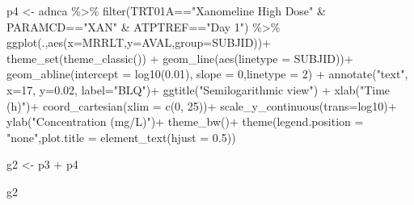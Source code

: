 \documentclass[
  letterpaper,
  DIV=11,
  numbers=noendperiod]{scrreprt}
\newenvironment{Shaded}{\begin{snugshade}}{\end{snugshade}}
\newcommand{\AttributeTok}[1]{\textcolor[rgb]{0.40,0.45,0.13}{#1}}
\newcommand{\DecValTok}[1]{\textcolor[rgb]{0.68,0.00,0.00}{#1}}
\newcommand{\FloatTok}[1]{\textcolor[rgb]{0.68,0.00,0.00}{#1}}
\newcommand{\FunctionTok}[1]{\textcolor[rgb]{0.28,0.35,0.67}{#1}}
\newcommand{\NormalTok}[1]{\textcolor[rgb]{0.00,0.23,0.31}{#1}}
\newcommand{\OtherTok}[1]{\textcolor[rgb]{0.00,0.23,0.31}{#1}}
\newcommand{\SpecialCharTok}[1]{\textcolor[rgb]{0.37,0.37,0.37}{#1}}
\newcommand{\StringTok}[1]{\textcolor[rgb]{0.13,0.47,0.30}{#1}}
\begin{document}
\begin{Shaded}
\begin{Highlighting}[]
\NormalTok{p4 }\OtherTok{\textless{}{-}}\NormalTok{ adnca }\SpecialCharTok{\%\textgreater{}\%} 
  \FunctionTok{filter}\NormalTok{(TRT01A}\SpecialCharTok{==}\StringTok{"Xanomeline High Dose"} \SpecialCharTok{\&} 
\NormalTok{        PARAMCD}\SpecialCharTok{==}\StringTok{"XAN"} \SpecialCharTok{\&}\NormalTok{ ATPTREF}\SpecialCharTok{==}\StringTok{"Day 1"}\NormalTok{) }\SpecialCharTok{\%\textgreater{}\%}
  \FunctionTok{ggplot}\NormalTok{(.,}\FunctionTok{aes}\NormalTok{(}\AttributeTok{x=}\NormalTok{MRRLT,}\AttributeTok{y=}\NormalTok{AVAL,}\AttributeTok{group=}\NormalTok{SUBJID))}\SpecialCharTok{+}
  \FunctionTok{theme\_set}\NormalTok{(}\FunctionTok{theme\_classic}\NormalTok{()) }\SpecialCharTok{+}
  \FunctionTok{geom\_line}\NormalTok{(}\FunctionTok{aes}\NormalTok{(}\AttributeTok{linetype =}\NormalTok{ SUBJID))}\SpecialCharTok{+}
  \FunctionTok{geom\_abline}\NormalTok{(}\AttributeTok{intercept =} \FunctionTok{log10}\NormalTok{(}\FloatTok{0.01}\NormalTok{), }\AttributeTok{slope =} \DecValTok{0}\NormalTok{,}\AttributeTok{linetype =} \DecValTok{2}\NormalTok{) }\SpecialCharTok{+}
  \FunctionTok{annotate}\NormalTok{(}\StringTok{"text"}\NormalTok{, }\AttributeTok{x=}\DecValTok{17}\NormalTok{, }\AttributeTok{y=}\FloatTok{0.02}\NormalTok{, }\AttributeTok{label=}\StringTok{"BLQ"}\NormalTok{)}\SpecialCharTok{+}
  \FunctionTok{ggtitle}\NormalTok{(}\StringTok{"Semilogarithmic view"}\NormalTok{) }\SpecialCharTok{+}
  \FunctionTok{xlab}\NormalTok{(}\StringTok{"Time (h)"}\NormalTok{)}\SpecialCharTok{+}
  \FunctionTok{coord\_cartesian}\NormalTok{(}\AttributeTok{xlim =} \FunctionTok{c}\NormalTok{(}\DecValTok{0}\NormalTok{, }\DecValTok{25}\NormalTok{))}\SpecialCharTok{+}
  \FunctionTok{scale\_y\_continuous}\NormalTok{(}\AttributeTok{trans=}\StringTok{\textquotesingle{}log10\textquotesingle{}}\NormalTok{)}\SpecialCharTok{+}
  \FunctionTok{ylab}\NormalTok{(}\StringTok{"Concentration (mg/L)"}\NormalTok{)}\SpecialCharTok{+}
  \FunctionTok{theme\_bw}\NormalTok{()}\SpecialCharTok{+} 
  \FunctionTok{theme}\NormalTok{(}\AttributeTok{legend.position =} \StringTok{"none"}\NormalTok{,}\AttributeTok{plot.title =} \FunctionTok{element\_text}\NormalTok{(}\AttributeTok{hjust =} \FloatTok{0.5}\NormalTok{)) }

\NormalTok{g2 }\OtherTok{\textless{}{-}}\NormalTok{ p3 }\SpecialCharTok{+}\NormalTok{ p4}

\NormalTok{g2}
\end{Highlighting}
\end{Shaded}
\end{document}
